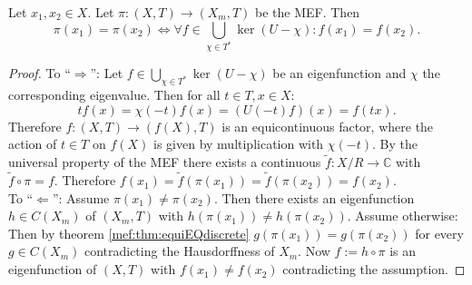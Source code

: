 \begin{theorem}
  \label{thm:MEF_EFchar}
  Let $x_1,x_2 \in X$. Let $\pi : (X,T) \to (X_m,T)$ be the MEF.
  Then
  \begin{equation*}
  \pi (x_1) = \pi (x_2) \Leftrightarrow 
    \forall f \in \bigcup_{\chi \in T^*} \ker (U- \chi) : f(x_1) = f(x_2).
  \end{equation*}
\end{theorem}
\begin{proof}
  To \enquote{$\Rightarrow$}:
  Let $f \in \bigcup_{\chi \in T^*} \ker (U- \chi)$ be an eigenfunction and $\chi$ the corresponding eigenvalue.  Then for all $t \in T, x \in X$:
  \begin{equation*}
    t f(x) = \chi (-t) f (x) = (U(-t) f)(x) = f(tx).
  \end{equation*}
  Therefore $f: (X,T) \to (f(X),T)$ is an equicontinuous factor, where the action of $t \in T$ on $f(X)$ is given by multiplication with $\chi(-t)$.
  By the universal property of the MEF there exists a continuous $\tilde{f}  : X/R  \to \mathbb{C}$ with $\tilde{f} \circ \pi = f$.
  Therefore $f(x_1) = \tilde{f} (\pi (x_1) )=  \tilde{f} ( \pi (x_2)) = f (x_2)$.\\
  To \enquote{$\Leftarrow$}:
  Assume $\pi (x_1) \neq \pi (x_2)$.
  Then there exists an eigenfunction $h \in C(X_m)$ of $(X_m,T)$ with $h (\pi(x_1)) \neq h(\pi (x_2))$.
  Assume otherwise: Then by theorem \ref{mef:thm:equiEQdiscrete} $g (\pi (x_1)) = g(\pi (x_2))$ for every $g \in C(X_m)$ contradicting the Hausdorffness of $X_m$.
  Now $f:= h \circ \pi$ is an eigenfunction of $(X,T)$ with $f(x_1) \neq f(x_2)$ contradicting the assumption.
\end{proof}

